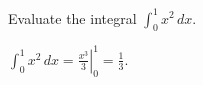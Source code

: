 \question Evaluate the integral $\int_0^1 x^2 \, dx$.
\begin{solution}
$\int_0^1 x^2 \, dx = \left.\frac{x^3}{3}\right|_0^1 = \frac{1}{3}$.
\end{solution}

